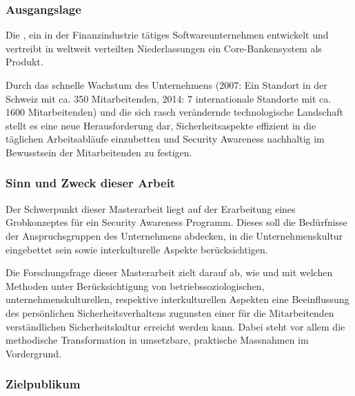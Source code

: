 \documentclass[../../main.tex]{subfiles}
\begin{document}

\subsubsection*{Ausgangslage}

\begin{sloppypar}
Die \companylong, ein in der Finanzindustrie tätiges Softwareunternehmen entwickelt und vertreibt in weltweit verteilten Niederlassungen ein Core-Bankensystem als Produkt.

Durch das schnelle Wachstum des Unternehmens (2007: Ein Standort in der Schweiz mit ca. 350 Mitarbeitenden, 2014: 7 internationale Standorte mit ca. 1600 Mitarbeitenden) und die sich rasch verändernde technologische Landschaft stellt es eine neue Herausforderung dar, Sicherheitsaspekte effizient in die täglichen Arbeitsabläufe einzubetten und Security Awareness nachhaltig im Bewusstsein der Mitarbeitenden zu festigen.
\end{sloppypar}

\subsubsection*{Sinn und Zweck dieser Arbeit}

\begin{sloppypar}
Der Schwerpunkt dieser Masterarbeit liegt auf der Erarbeitung eines Grobkonzeptes für ein Security Awareness Programm. Dieses soll die Bedürfnisse der Anspruchsgruppen des Unternehmens abdecken, in die Unternehmenskultur eingebettet sein sowie interkulturelle Aspekte berücksichtigen.

Die Forschungsfrage dieser Masterarbeit zielt darauf ab, wie und mit welchen Methoden unter Berücksichtigung von betriebssoziologischen, unternehmenskulturellen, respektive interkulturellen Aspekten eine Beeinflussung des persönlichen Sicherheitsverhaltens zugunsten einer für die Mitarbeitenden verständlichen Sicherheitskultur erreicht werden kann. Dabei steht vor allem die methodische Transformation in umsetzbare, praktische Massnahmen im Vordergrund.
\end{sloppypar}

\subsubsection*{Zielpublikum}
\end{document}
